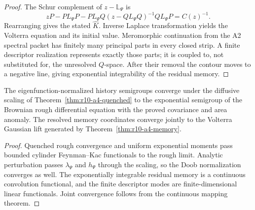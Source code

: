 \begin{proof}
The Schur complement of \(z-\mathbb L_\Psi\) is
\[
 zP-PL_\Psi P-PL_\Psi Q(z-QL_\Psi Q)^{-1}QL_\Psi P=C(z)^{-1}.
\]
Rearranging gives the stated \(\widehat K\).  Inverse Laplace transformation
yields the Volterra equation and its initial value.  Meromorphic continuation
from the A2 spectral packet has finitely many principal parts in every closed
strip.  A finite descriptor realization represents exactly those parts; it
is coupled to, not substituted for, the unresolved \(Q\)-space.  After their
removal the contour moves to a negative line, giving exponential integrability
of the residual memory.
\end{proof}

\begin{theorem}
\label{thm:r10-a4-main}
The eigenfunction-normalized history semigroups converge under the diffusive
scaling of Theorem~\ref{thm:r10-a4-quenched} to the exponential semigroup of
the Brownian rough differential equation with the proved covariance and area
anomaly.  The resolved memory coordinates converge jointly to the Volterra
Gaussian lift generated by Theorem~\ref{thm:r10-a4-memory}.
\end{theorem}

\begin{proof}
Quenched rough convergence and uniform exponential moments pass bounded
cylinder Feynman--Kac functionals to the rough limit.  Analytic perturbation
passes \(\lambda_\Psi\) and \(h_\Psi\) through the scaling, so the Doob
normalization converges as well.  The exponentially integrable residual
memory is a continuous convolution functional, and the finite descriptor
modes are finite-dimensional linear functionals.  Joint convergence follows
from the continuous mapping theorem.
\end{proof}
